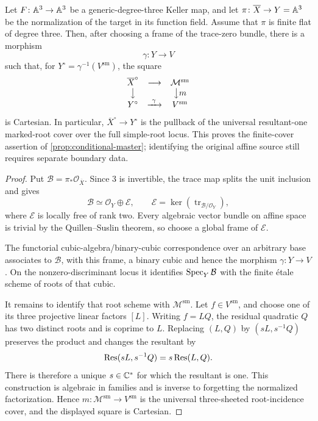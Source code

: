 \begin{proposition}
\label{prop:master-cover-cartesian}
Let \(F\colon\mathbb A^3\to\mathbb A^3\) be a generic-degree-three Keller map, and let
\(\pi\colon\overline X\to Y=\mathbb A^3\) be the normalization of the target in its
function field.  Assume that \(\pi\) is finite flat of degree three.  Then,
after choosing a frame of the trace-zero bundle, there is a morphism
\[
\gamma\colon Y\longrightarrow V
\]
such that, for \(Y^\circ=\gamma^{-1}(V^{\mathrm{sm}})\), the square
\[
\begin{array}{ccc}
\overline X^\circ&\longrightarrow&\mathcal M^{\mathrm{sm}}\\
\big\downarrow&&\big\downarrow m\\
Y^\circ&\xrightarrow{\ \gamma\ }&V^{\mathrm{sm}}
\end{array}
\]
is Cartesian.  In particular, \(\overline X^\circ\to Y^\circ\) is the
pullback of the universal resultant-one marked-root cover over the full
simple-root locus.  This proves the finite-cover assertion of
\cref{prop:conditional-master}; identifying the original affine source still
requires separate boundary data.
\end{proposition}

\begin{proof}
Put \(\mathcal B=\pi_*\mathcal O_{\overline X}\).  Since \(3\) is invertible,
the trace map splits the unit inclusion and gives
\[
\mathcal B\simeq\mathcal O_Y\oplus\mathcal E,
\qquad
\mathcal E=\ker(\operatorname{tr}_{\mathcal B/\mathcal O_Y}),
\]
where \(\mathcal E\) is locally free of rank two.  Every algebraic vector
bundle on affine space is trivial by the Quillen--Suslin theorem, so choose a
global frame of \(\mathcal E\).

The functorial cubic-algebra/binary-cubic correspondence over an arbitrary
base \cite{miranda1985,wood2011} associates to \(\mathcal B\), with this
frame, a binary cubic and hence the morphism \(\gamma\colon Y\to V\).  On the
nonzero-discriminant locus it identifies \(\operatorname{Spec}_Y\mathcal B\) with the
finite étale scheme of roots of that cubic.

It remains to identify that root scheme with \(\mathcal M^{\mathrm{sm}}\).
Let \(f\in V^{\mathrm{sm}}\), and choose one of its three projective linear
factors \([L]\).  Writing \(f=LQ\), the residual quadratic \(Q\) has two
distinct roots and is coprime to \(L\).  Replacing \((L,Q)\) by
\((sL,s^{-1}Q)\) preserves the product and changes the resultant by
\[
\operatorname{Res}(sL,s^{-1}Q)=s\operatorname{Res}(L,Q).
\]
There is therefore a unique \(s\in\mathbb C^*\) for which the resultant is one.
This construction is algebraic in families and is inverse to forgetting the
normalized factorization.  Hence
\(m\colon\mathcal M^{\mathrm{sm}}\to V^{\mathrm{sm}}\) is the universal
three-sheeted root-incidence cover, and the displayed square is Cartesian.
\end{proof}

